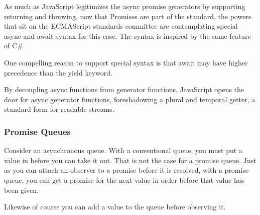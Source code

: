 As much as JavaScript legitimizes the async promise generators by supporting returning and throwing, now that Promises are part of the standard, the powers that sit on the ECMAScript standards committee are contemplating special async and await syntax for this case. The syntax is inspired by the same feature of C\#.

One compelling reason to support special syntax is that await may have higher precedence than the yield keyword.

By decoupling async functions from generator functions, JavaScript opens the door for async generator functions, foreshadowing a plural and temporal getter, a standard form for readable streams.

\subsubsection{Promise Queues}

Consider an asynchronous queue. With a conventional queue, you must put a value in before you can take it out. That is not the case for a promise queue. Just as you can attach an observer to a promise before it is resolved, with a promise queue, you can get a promise for the next value in order before that value has been given.

Likewise of course you can add a value to the queue before observing it.

